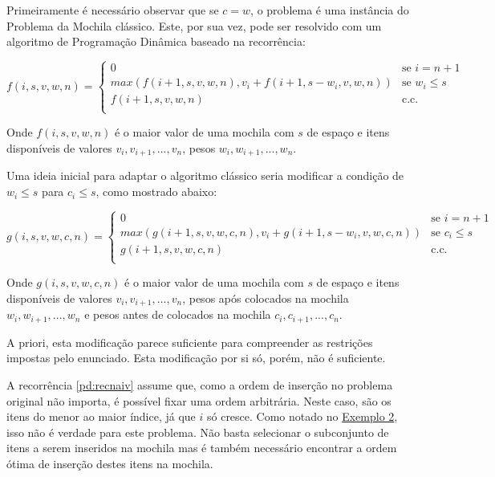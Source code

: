 Primeiramente é necessário observar que se $c = w$, o problema é uma instância do Problema da Mochila clássico. Este, por sua vez, pode ser resolvido com um algoritmo de Programação Dinâmica \cite{stefanot} baseado na recorrência:

\begin{equation} \label{pd:recnaiv}
  f(i, s, v, w, n) =
  \begin{cases}
  0                                                             & \text{se $i = n + 1$} \\
  max(f(i + 1, s, v, w, n), v_i + f(i + 1, s - w_i, v, w, n))   & \text{se $w_i \leq s$} \\
  f(i + 1, s, v, w, n)                                          & \text{c.c.} \\
  \end{cases}
\end{equation}

Onde $f(i, s, v, w, n)$ é o maior valor de uma mochila com $s$ de espaço e itens disponíveis de valores $v_i, v_{i + 1}, ..., v_n$, pesos $w_i, w_{i + 1}, ..., w_n$.

Uma ideia inicial para adaptar o algoritmo clássico seria modificar a condição de $w_i \leq s$ para $c_i \leq s$, como mostrado abaixo:

\begin{equation} \label{pd:recok}
  g(i, s, v, w, c, n) =
  \begin{cases}
  0                                                                   & \text{se $i = n + 1$} \\
  max(g(i + 1, s, v, w, c, n), v_i + g(i + 1, s - w_i, v, w, c, n))   & \text{se $c_i \leq s$} \\
  g(i + 1, s, v, w, c, n)                                             & \text{c.c.} \\
  \end{cases}
\end{equation}

Onde $g(i, s, v, w, c, n)$ é o maior valor de uma mochila com $s$ de espaço e itens disponíveis de valores $v_i, v_{i + 1}, ..., v_n$, pesos após colocados na mochila $w_i, w_{i + 1}, ..., w_n$ e pesos antes de colocados na mochila $c_i, c_{i + 1}, ..., c_n$.

A priori, esta modificação parece suficiente para compreender as restrições impostas pelo enunciado. Esta modificação por si só, porém, não é suficiente. 

A recorrência \ref{pd:recnaiv} assume que, como a ordem de inserção no problema original não importa, é possível fixar uma ordem arbitrária. Neste caso, são os itens do menor ao maior índice, já que $i$ só cresce. Como notado no \hyperref[pd:ex2]{Exemplo 2}, isso não é verdade para este problema. Não basta selecionar o subconjunto de itens a serem inseridos na mochila mas é também necessário encontrar a ordem ótima de inserção destes itens na mochila.


